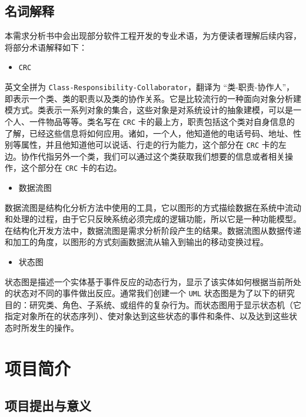 \documentclass[12pt,a4paper,UTF8]{article}
\begin{document}
\subsection{名词解释}

本需求分析书中会出现部分软件工程开发的专业术语，为方便读者理解后续内容，将部分术语解释如下：

\begin{itemize}
  \item \verb|CRC|
\end{itemize}

英文全拼为 \verb|Class-Responsibility-Collaborator|，翻译为 “类-职责-协作人”，即表示一个类、类的职责以及类的协作关系。它是比较流行的一种面向对象分析建模方式。类表示一系列对象的集合，这些对象是对系统设计的抽象建模，可以是一个人、一件物品等等。类名写在 \verb|CRC| 卡的最上方，职责包括这个类对自身信息的了解，已经这些信息将如何应用。诸如，一个人，他知道他的电话号码、地址、性别等属性，并且他知道他可以说话、行走的行为能力，这个部分在 \verb|CRC| 卡的左边。协作代指另外一个类，我们可以通过这个类获取我们想要的信息或者相关操作，这个部分在 \verb|CRC| 卡的右边。

\begin{itemize}
  \item 数据流图
\end{itemize}

数据流图是结构化分析方法中使用的工具，它以图形的方式描绘数据在系统中流动和处理的过程，由于它只反映系统必须完成的逻辑功能，所以它是一种功能模型。在结构化开发方法中，数据流图是需求分析阶段产生的结果。数据流图从数据传递和加工的角度，以图形的方式刻画数据流从输入到输出的移动变换过程。

\begin{itemize}
  \item 状态图
\end{itemize}

状态图是描述一个实体基于事件反应的动态行为，显示了该实体如何根据当前所处的状态对不同的事件做出反应。通常我们创建一个 \verb|UML| 状态图是为了以下的研究目的：研究类、角色、子系统、或组件的复杂行为。而状态图用于显示状态机（它指定对象所在的状态序列）、使对象达到这些状态的事件和条件、以及达到这些状态时所发生的操作。

\section{项目简介}

\subsection{项目提出与意义}
\end{document}
